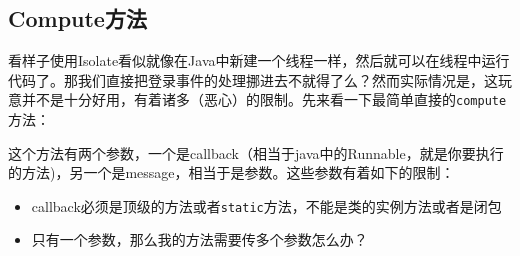 \documentclass[12pt]{article}
\begin{document}
\begin{Shaded}
\begin{Highlighting}[]
\OperatorTok{\textless{}}\OperatorTok{\textless{}}\OperatorTok{\textgreater{}\textgreater{}} \OperatorTok{\{}
  \OperatorTok{=}
      \NormalTok{(}\NormalTok{);}

  \OperatorTok{,}
\OperatorTok{\}}
\end{Highlighting}
\end{Shaded}

\subsection{Compute方法}\label{computeux65b9ux6cd5}

看样子使用Isolate看似就像在Java中新建一个线程一样，然后就可以在线程中运行代码了。那我们直接把登录事件的处理挪进去不就得了么？然而实际情况是，这玩意并不是十分好用，有着诸多（恶心）的限制。先来看一下最简单直接的\texttt{compute}方法：

\begin{Shaded}
\begin{Highlighting}[]
\OperatorTok{\textless{}}\OperatorTok{,}\OperatorTok{\textgreater{}} \OperatorTok{=}\OperatorTok{\textless{}}\OperatorTok{\textgreater{}} 
\end{Highlighting}
\end{Shaded}

这个方法有两个参数，一个是callback（相当于java中的Runnable，就是你要执行的方法)，另一个是message，相当于是参数。这些参数有着如下的限制：

\begin{itemize}
\tightlist
\item
  callback必须是顶级的方法或者\texttt{static}方法，不能是类的实例方法或者是闭包
\item
  只有一个参数，那么我的方法需要传多个参数怎么办？
\end{itemize}
\end{document}
